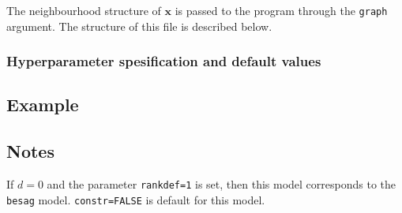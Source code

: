\documentclass[a4paper,11pt]{article}
\begin{document}
The neighbourhood structure of $\mathbf{x}$ is passed to the program
through the {\tt graph} argument.  The structure of this file is
described below.

\subsubsection*{Hyperparameter spesification and default values}



\subsection*{Example}



\subsection*{Notes}

If $d=0$ and the parameter \texttt{rankdef=1} is set, then this model
corresponds to the \texttt{besag} model. \texttt{constr=FALSE} is
default for this model.
\end{document}
